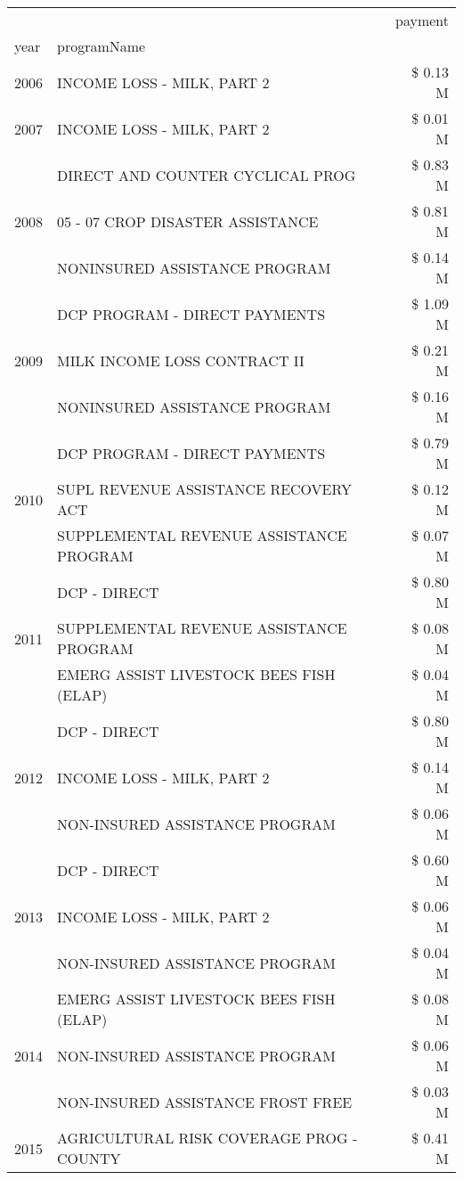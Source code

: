 \begin{tabular}{llr}
\toprule
 &  & payment \\
year & programName &  \\
\midrule
2006 & INCOME LOSS - MILK, PART 2 & \$ 0.13 M \\
\cline{1-3}
2007 & INCOME LOSS - MILK, PART 2 & \$ 0.01 M \\
\cline{1-3}
\multirow[t]{3}{*}{2008} & DIRECT AND COUNTER CYCLICAL PROG & \$ 0.83 M \\
 & 05 - 07 CROP DISASTER ASSISTANCE & \$ 0.81 M \\
 & NONINSURED ASSISTANCE PROGRAM & \$ 0.14 M \\
\cline{1-3}
\multirow[t]{3}{*}{2009} & DCP PROGRAM - DIRECT PAYMENTS & \$ 1.09 M \\
 & MILK INCOME LOSS CONTRACT II & \$ 0.21 M \\
 & NONINSURED ASSISTANCE PROGRAM & \$ 0.16 M \\
\cline{1-3}
\multirow[t]{3}{*}{2010} & DCP PROGRAM - DIRECT PAYMENTS & \$ 0.79 M \\
 & SUPL REVENUE ASSISTANCE RECOVERY ACT & \$ 0.12 M \\
 & SUPPLEMENTAL REVENUE ASSISTANCE PROGRAM & \$ 0.07 M \\
\cline{1-3}
\multirow[t]{3}{*}{2011} & DCP - DIRECT & \$ 0.80 M \\
 & SUPPLEMENTAL REVENUE ASSISTANCE PROGRAM & \$ 0.08 M \\
 & EMERG ASSIST LIVESTOCK BEES FISH (ELAP) & \$ 0.04 M \\
\cline{1-3}
\multirow[t]{3}{*}{2012} & DCP - DIRECT & \$ 0.80 M \\
 & INCOME LOSS - MILK, PART 2 & \$ 0.14 M \\
 & NON-INSURED ASSISTANCE PROGRAM & \$ 0.06 M \\
\cline{1-3}
\multirow[t]{3}{*}{2013} & DCP - DIRECT & \$ 0.60 M \\
 & INCOME LOSS - MILK, PART 2 & \$ 0.06 M \\
 & NON-INSURED ASSISTANCE PROGRAM & \$ 0.04 M \\
\cline{1-3}
\multirow[t]{3}{*}{2014} & EMERG ASSIST LIVESTOCK BEES FISH (ELAP) & \$ 0.08 M \\
 & NON-INSURED ASSISTANCE PROGRAM & \$ 0.06 M \\
 & NON-INSURED ASSISTANCE FROST FREE & \$ 0.03 M \\
\cline{1-3}
\multirow[t]{3}{*}{2015} & AGRICULTURAL RISK COVERAGE PROG - COUNTY & \$ 0.41 M \\

\end{tabular}
